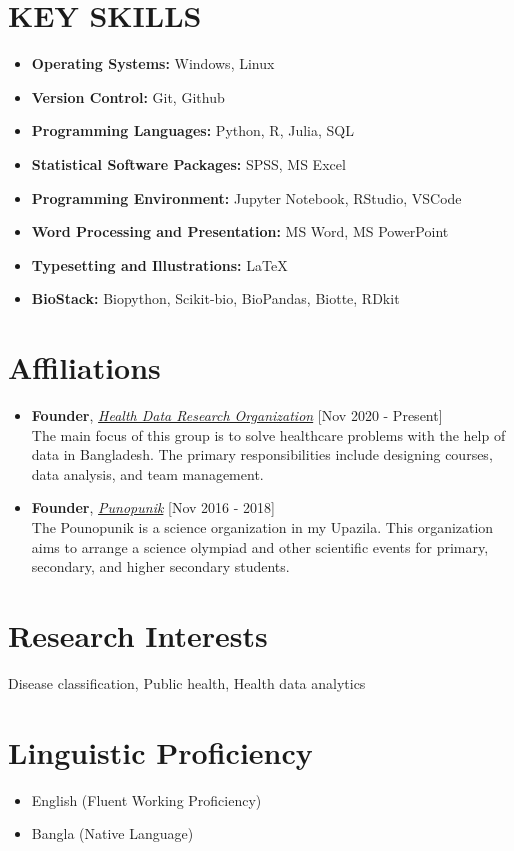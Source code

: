 \documentclass[11pt,a4paper]{moderncv}
\begin{document}
\section{KEY SKILLS}
\begin{itemize}
	\item \textbf{Operating Systems:} Windows, Linux
	\item \textbf{Version Control:} Git, Github
	\item \textbf{Programming Languages:} Python, R, Julia, SQL
	\item \textbf{Statistical Software Packages:} SPSS, MS Excel
	\item \textbf{Programming Environment:} Jupyter Notebook, RStudio, VSCode
	\item \textbf{Word Processing and Presentation:} MS Word, MS PowerPoint
	\item \textbf{Typesetting and Illustrations:} \LaTeX
	\item \textbf{BioStack:} Biopython, Scikit-bio, BioPandas, Biotte, RDkit
\end{itemize}

\section{Affiliations}
\begin{itemize}
	\item \textbf{Founder}, 
	\textit{\href{https://hdrobd.org/}{Health Data Research Organization}} 
	\hfill [Nov 2020 - Present]\\ 
	The main focus of this group is to solve healthcare problems with the help 
	of data in Bangladesh. The primary responsibilities include designing 
	courses, data analysis, and team management.
	\item \textbf{Founder}, 
	\textit{\href{https://hdrobd.org/}{Punopunik}} 
	\hfill [Nov 2016 - 2018]\\
	The Pounopunik is a science organization in my Upazila. This organization 
	aims to arrange a science olympiad and other scientific events for primary, 
	secondary, and higher secondary students. 

\end{itemize}

\section{Research Interests}
Disease classification, Public health, Health data analytics

\section{Linguistic Proficiency}
\begin{itemize}  	
	\item English (Fluent Working Proficiency)
	\item Bangla (Native Language)
\end{itemize}
\end{document}
